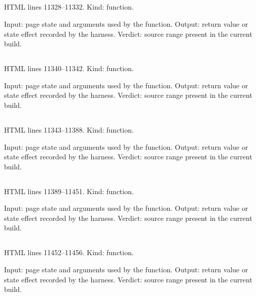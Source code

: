 \subsection*{\texttt{}}
\label{vf_627_selDownloadZip}
HTML lines 11328--11332. Kind: function.

Input: page state and arguments used by the function.
Output: return value or state effect recorded by the harness.
Verdict: source range present in the current build.

\subsection*{\texttt{}}
\label{vf_628_selReportTitle}
HTML lines 11340--11342. Kind: function.

Input: page state and arguments used by the function.
Output: return value or state effect recorded by the harness.
Verdict: source range present in the current build.

\subsection*{\texttt{}}
\label{vf_629_selTableBlock}
HTML lines 11343--11388. Kind: function.

Input: page state and arguments used by the function.
Output: return value or state effect recorded by the harness.
Verdict: source range present in the current build.

\subsection*{\texttt{}}
\label{vf_630_selBuildReport}
HTML lines 11389--11451. Kind: function.

Input: page state and arguments used by the function.
Output: return value or state effect recorded by the harness.
Verdict: source range present in the current build.

\subsection*{\texttt{}}
\label{vf_631_selDownloadReport}
HTML lines 11452--11456. Kind: function.

Input: page state and arguments used by the function.
Output: return value or state effect recorded by the harness.
Verdict: source range present in the current build.

